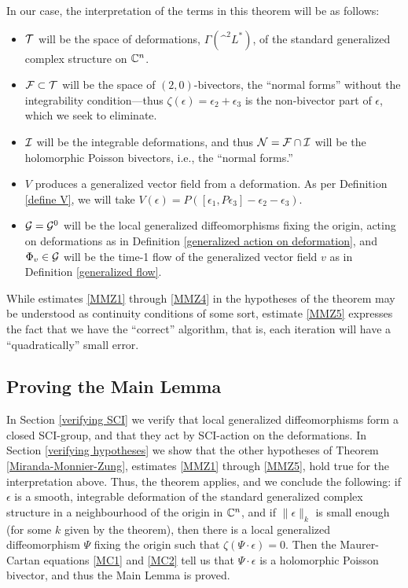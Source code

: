 \documentclass{article}
\begin{document}
\begin{rem}\label{interpretation of theorem}
In our case, the interpretation of the terms in this theorem will be as follows:
\begin{itemize}
\item $\mathcal{T}$ will be the space of deformations, $\Gamma(\^ ^2 L^*)$, of the standard generalized complex structure on $\mathbb C^n$.
\item $\mathcal{F} \subset \mathcal{T}$ will be the space of $(2,0)$-bivectors, the ``normal forms'' without the integrability condition---thus $\zeta(\epsilon) = \epsilon_2 + \epsilon_3$ is the non-bivector part of $\epsilon$, which we seek to eliminate.
\item $\mathcal{I}$ will be the integrable deformations, and thus $\mathcal{N} = \mathcal{F} \cap \mathcal{I}$ will be the holomorphic Poisson bivectors, i.e., the ``normal forms.''
\item $V$ produces a generalized vector field from a deformation.  As per Definition \ref{define V}, we will take $V(\epsilon) = P([\epsilon_1, P\epsilon_3] - \epsilon_2 - \epsilon_3)$.
\item $\mathcal{G}=\mathcal{G}^0$ will be the local generalized diffeomorphisms fixing the origin, acting on deformations as in Definition \ref{generalized action on deformation}, and $\Phi_v \in \mathcal{G}$ will be the time-1 flow of the generalized vector field $v$ as in Definition \ref{generalized flow}.
\end{itemize}

While estimates \eqref{MMZ1} through \eqref{MMZ4} in the hypotheses of the theorem may be understood as continuity conditions of some sort, estimate \eqref{MMZ5} expresses the fact that we have the ``correct'' algorithm, that is, each iteration will have a ``quadratically'' small error.
\end{rem}

\subsection{Proving the Main Lemma}\label{prove main lemma}
In Section \ref{verifying SCI} we verify that local generalized diffeomorphisms form a closed SCI-group, and that they act by SCI-action on the deformations.  In Section \ref{verifying hypotheses} we show that the other hypotheses of Theorem \ref{Miranda-Monnier-Zung}, estimates \eqref{MMZ1} through \eqref{MMZ5}, hold true for the interpretation above.  Thus, the theorem applies, and we conclude the following: if $\epsilon$ is a smooth, integrable deformation of the standard generalized complex structure in a neighbourhood of the origin in $\mathbb C^n$, and if $\|\epsilon\|_k$ is small enough (for some $k$ given by the theorem), then there is a local generalized diffeomorphism $\Psi$ fixing the origin such that $\zeta(\Psi\cdot\epsilon)=0$.  Then the Maurer-Cartan equations \eqref{MC1} and \eqref{MC2} tell us that $\Psi\cdot\epsilon$ is a holomorphic Poisson bivector, and thus the Main Lemma is proved.
\end{document}
